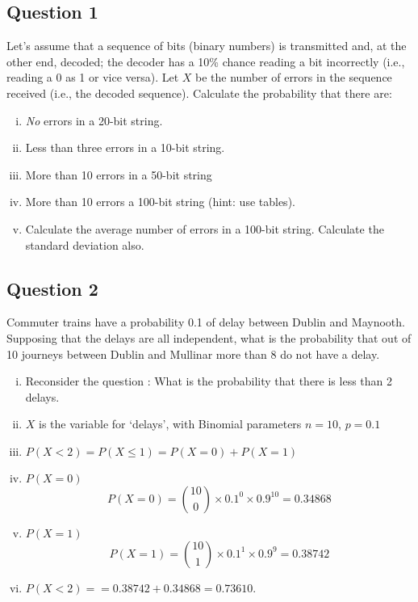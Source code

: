 \documentclass[]{report}
\begin{document}
	

\subsection*{Question 1}

Let's assume that a sequence of bits (binary numbers) is transmitted and, at the other end, decoded; the decoder has a 10\% chance reading a bit incorrectly (i.e., reading a 0 as 1 or vice versa). 
Let $X$ be the number of errors in the sequence received (i.e., the decoded sequence). Calculate the probability that there are: \\[-0.2cm]

\begin{enumerate}[(i)]
\item \emph{No} errors in a 20-bit string.  \item Less than three errors in a 10-bit string.  \item More than 10 errors in a 50-bit string \item More than 10 errors  a 100-bit string (hint: use tables).  \item Calculate the average number of errors in a 100-bit string. Calculate the standard deviation also.
\end{enumerate}

\subsection*{Question 2}

	Commuter trains have a probability 0.1 of delay
	between Dublin and Maynooth. Supposing that the delays are all independent,
	what is the probability that out of 10 journeys between Dublin and
	Mullinar more than 8 do not have a delay.
	\begin{enumerate}[(i)]
		\item Reconsider the question : What is the probability that there is less than 2 delays.
		\item $X$ is the variable for `delays', with Binomial parameters $n=10$, $p=0.1$
		\item $P(X < 2) = P(X \leq 1) = P(X=0)+P(X=1)$
		\item $P(X=0)$
		\[P(X=0)= {10 \choose 0} \times 0.1^0  \times 0.9^10 = 0.34868\]
		\item $P(X=1)$
		\[P(X=1)= {10 \choose 1} \times 0.1^1  \times 0.9^9 = 0.38742\]
		\item $P(X < 2) = = 0.38742 + 0.34868 = 0.73610.$
	\end{enumerate}
	
\end{document}
